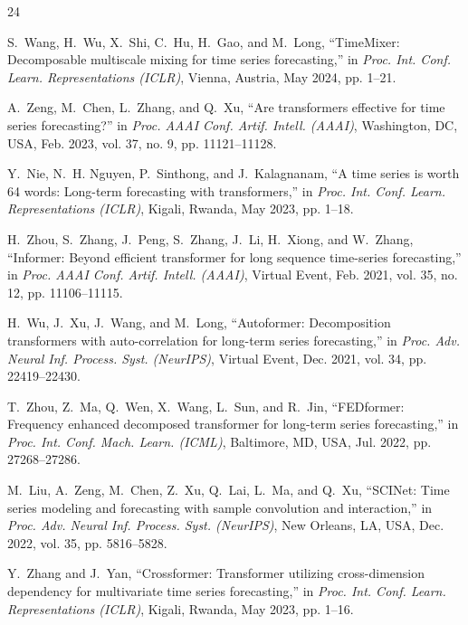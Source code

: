 \documentclass[journal]{IEEEtran}
\begin{document}
\begin{thebibliography}{24}

S.~Wang, H.~Wu, X.~Shi, C.~Hu, H.~Gao, and M.~Long, ``TimeMixer: Decomposable multiscale mixing for time series forecasting,'' in \textit{Proc. Int. Conf. Learn. Representations (ICLR)}, Vienna, Austria, May 2024, pp. 1--21.

A.~Zeng, M.~Chen, L.~Zhang, and Q.~Xu, ``Are transformers effective for time series forecasting?'' in \textit{Proc. AAAI Conf. Artif. Intell. (AAAI)}, Washington, DC, USA, Feb. 2023, vol. 37, no. 9, pp. 11121--11128.

Y.~Nie, N.~H. Nguyen, P.~Sinthong, and J.~Kalagnanam, ``A time series is worth 64 words: Long-term forecasting with transformers,'' in \textit{Proc. Int. Conf. Learn. Representations (ICLR)}, Kigali, Rwanda, May 2023, pp. 1--18.

H.~Zhou, S.~Zhang, J.~Peng, S.~Zhang, J.~Li, H.~Xiong, and W.~Zhang, ``Informer: Beyond efficient transformer for long sequence time-series forecasting,'' in \textit{Proc. AAAI Conf. Artif. Intell. (AAAI)}, Virtual Event, Feb. 2021, vol. 35, no. 12, pp. 11106--11115.

H.~Wu, J.~Xu, J.~Wang, and M.~Long, ``Autoformer: Decomposition transformers with auto-correlation for long-term series forecasting,'' in \textit{Proc. Adv. Neural Inf. Process. Syst. (NeurIPS)}, Virtual Event, Dec. 2021, vol. 34, pp. 22419--22430.

T.~Zhou, Z.~Ma, Q.~Wen, X.~Wang, L.~Sun, and R.~Jin, ``FEDformer: Frequency enhanced decomposed transformer for long-term series forecasting,'' in \textit{Proc. Int. Conf. Mach. Learn. (ICML)}, Baltimore, MD, USA, Jul. 2022, pp. 27268--27286.

M.~Liu, A.~Zeng, M.~Chen, Z.~Xu, Q.~Lai, L.~Ma, and Q.~Xu, ``SCINet: Time series modeling and forecasting with sample convolution and interaction,'' in \textit{Proc. Adv. Neural Inf. Process. Syst. (NeurIPS)}, New Orleans, LA, USA, Dec. 2022, vol. 35, pp. 5816--5828.

Y.~Zhang and J.~Yan, ``Crossformer: Transformer utilizing cross-dimension dependency for multivariate time series forecasting,'' in \textit{Proc. Int. Conf. Learn. Representations (ICLR)}, Kigali, Rwanda, May 2023, pp. 1--16.


\end{thebibliography}
\end{document}
